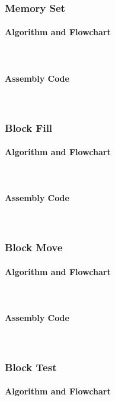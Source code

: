 \documentclass[12pt]{article}
\begin{document}
			\subsubsection{Memory Set}
			\paragraph{Algorithm and Flowchart}~\\
			\paragraph{Assembly Code}~\\
			
			
			\subsubsection{Block Fill}
			\paragraph{Algorithm and Flowchart}~\\
			\paragraph{Assembly Code}~\\
			
			
			\subsubsection{Block Move}
			\paragraph{Algorithm and Flowchart}~\\
			\paragraph{Assembly Code}~\\				
			
			\subsubsection{Block Test}
			\paragraph{Algorithm and Flowchart}~\\
\end{document}
